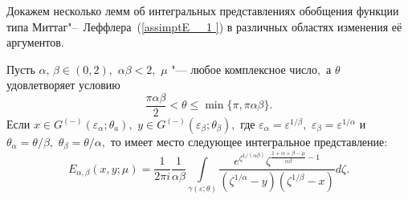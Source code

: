 Докажем несколько лемм об интегральных представлениях обобщения функции типа Миттаг"--~Леффлера~(\ref{assimptE__1 }) в различных областях
изменения её аргументов.
\begin{lemma}[1]
Пусть $\alpha,\,\beta \in (0, 2),$ $\alpha \beta <2,$ $\mu$ "--- любое комплексное число$,$ а $\theta$ удовлетворяет условию
\begin{equation}
\label{assimptE__4_}
\frac{\pi \alpha \beta }{2} <\theta \le \min \{\pi ,\pi \alpha \beta \}.
\end{equation}
Если $x\in G^{(-)} (\varepsilon _\alpha ; \theta_a ),$
$y\in G^{(-)} (\varepsilon _\beta  ;\theta _\beta ),$
где $\varepsilon _{\alpha } =\varepsilon ^{1/\beta} ,$
$\varepsilon _{\beta } =\varepsilon ^{1/ \alpha} $
и $\theta _{\alpha } =\theta /{\beta } ,$ $\theta _{\beta } =\theta /{\alpha } ,$
то имеет место следующее интегральное представление{\rm:}
\begin{equation}
\label{assimptE__5_}
E_{\alpha, \beta }  (x, y; \mu)=\frac{1}{2\pi i} \frac{1}{\alpha \beta } \int\limits_{\gamma (\varepsilon; \theta)}
\frac{e^{\zeta ^{1/(\alpha \beta)} }   \zeta ^{\frac{1+\alpha +\beta -\mu }{\alpha \beta } -1} }{\left(\zeta ^{1/ \alpha}  -y\right)\left(\zeta ^{1/\beta} -x\right)} d \zeta.
\end{equation}
\end{lemma}

